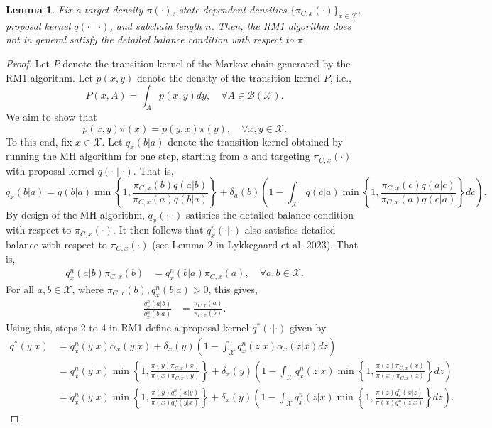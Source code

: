 \documentclass[12pt]{article}
\newtheorem{lemma}[theorem]{Lemma}
\theoremstyle{definition}
\theoremstyle{remark}
\theoremstyle{plain}
\begin{document}
\begin{lemma}
\label{lem:rm1-detailed-balance}
Fix a target density $\pi(\cdot)$, state-dependent densities $\{\pi_{C,x}(\cdot)\}_{x \in \mathcal{X}}$, 
proposal kernel $q(\cdot\mid\cdot)$, and subchain length $n$. 
Then, the RM1 algorithm does not in general satisfy the detailed balance condition with respect to $\pi$.
\end{lemma}
\begin{proof}
Let $P$ denote the transition kernel of the Markov chain generated by the RM1 algorithm.
Let $p(x, y)$ denote the density of the transition kernel $P$, i.e.,
\[
P(x, A) = \int_A p(x, y) dy, \quad \forall A\in\mathcal B(\mathcal X).
\]
We aim to show that 
\[
  p(x, y) \pi(x) = p(y, x) \pi(y), \quad \forall x,y\in\mathcal X.
\]
To this end, fix $x \in \mathcal X$. 
Let $q_x(b|a)$ denote the transition kernel obtained by 
running the MH algorithm for one step, starting from $a$ and targeting $\pi_{C,x}(\cdot)$ with proposal kernel $q(\cdot\mid\cdot)$.
That is,
\[
q_x(b|a) = q(b|a) \min\left\{1, \frac{\pi_{C,x}(b)q(a|b)}{\pi_{C,x}(a)q(b|a)}\right\} + \delta_a(b)\left(1 - \int_\mathcal X q(c|a) \min\left\{1, \frac{\pi_{C,x}(c)q(a|c)}{\pi_{C,x}(a)q(c|a)}\right\} dc\right).
\]
By design of the MH algorithm, $q_x(\cdot|\cdot)$ satisfies the detailed balance condition with respect to $\pi_{C,x}(\cdot)$. 
It then follows that $q_x^n(\cdot|\cdot)$ also satisfies detailed balance with respect to $\pi_{C,x}(\cdot)$ 
(see Lemma 2 in Lykkegaard et al. 2023).
That is, 
\begin{align}
  q_x^n(a|b) \pi_{C,x}(b) &= q_x^n(b|a) \pi_{C,x}(a), \quad \forall a,b\in\mathcal X.\nonumber
\end{align}
For all $a,b\in\mathcal X$, where $\pi_{C,x}(b), q_x^n(b|a) > 0$, this gives,
\begin{align}
  \frac{q_x^n(a|b)}{q_x^n(b|a)} &= \frac{\pi_{C,x}(a)}{\pi_{C,x}(b)}. 
\end{align}
Using this, steps 2 to 4 in RM1 
define a proposal kernel $q^*(\cdot|\cdot)$ given by
\begin{align}
  q^*(y|x) 
  &= q_x^n(y|x)\alpha_{x}(y|x) + \delta_x(y)\left(1 - \int_\mathcal X q_x^n(z|x) \alpha_{x}(z|x) dz\right) \nonumber\\
  &= q_x^n(y|x)\min\left\{1, \frac{\pi(y)\pi_{C,x}(x)}{\pi(x)\pi_{C,x}(y)}\right\} + \delta_x(y)\left(1 - \int_\mathcal X q_x^n(z|x) \min\left\{1, \frac{\pi(z)\pi_{C,x}(x)}{\pi(x)\pi_{C,x}(z)}\right\} dz\right) \nonumber\\
  &= q_x^n(y|x)\min\left\{1, \frac{\pi(y)q_x^n(x|y)}{\pi(x)q_x^n(y|x)}\right\} + \delta_x(y)\left(1 - \int_\mathcal X q_x^n(z|x) \min\left\{1, \frac{\pi(z)q_x^n(x|z)}{\pi(x)q_x^n(z|x)}\right\} dz\right).

\end{align}
\end{proof}
\end{document}
